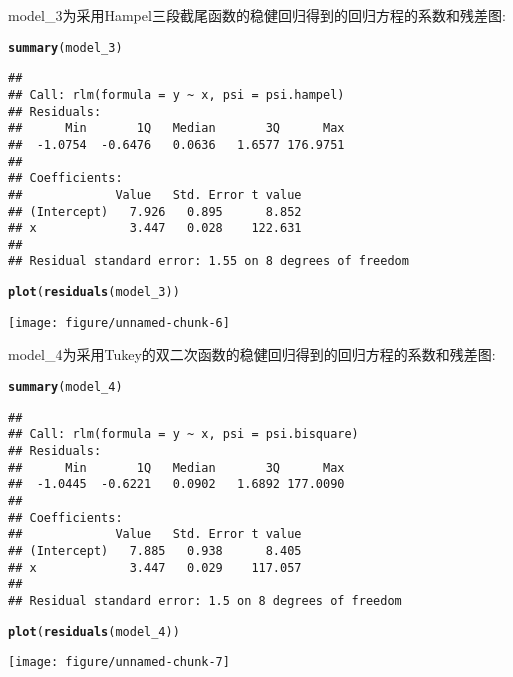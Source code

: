 \documentclass[english]{article}\usepackage[]{graphicx}\usepackage[]{color}
\makeatletter
\def\maxwidth{ %
  \ifdim\Gin@nat@width>\linewidth
    \linewidth
  \else
    \Gin@nat@width
  \fi
}
\newcommand{\hlkwd}[1]{\textcolor[rgb]{0.737,0.353,0.396}{\textbf{#1}}}%
\newenvironment{kframe}{%
 \def\at@end@of@kframe{}%
 \ifinner\ifhmode%
  \def\at@end@of@kframe{\end{minipage}}%
  \begin{minipage}{\columnwidth}%
 \fi\fi%
 \def\FrameCommand##1{\hskip\@totalleftmargin \hskip-\fboxsep
 \colorbox{shadecolor}{##1}\hskip-\fboxsep
     \hskip-\linewidth \hskip-\@totalleftmargin \hskip\columnwidth}%
 \MakeFramed {\advance\hsize-\width
   \@totalleftmargin\z@ \linewidth\hsize
   \@setminipage}}%
 {\par\unskip\endMakeFramed%
 \at@end@of@kframe}
\newenvironment{knitrout}{}{} %
\makeatother
\begin{document}
model\_3为采用Hampel三段截尾函数的稳健回归得到的回归方程的系数和残差图:

\begin{knitrout}
\color{fgcolor}\begin{kframe}
\begin{alltt}
\hlkwd{summary}(model_3)
\end{alltt}
\begin{verbatim}
## 
## Call: rlm(formula = y ~ x, psi = psi.hampel)
## Residuals:
##      Min       1Q   Median       3Q      Max 
##  -1.0754  -0.6476   0.0636   1.6577 176.9751 
## 
## Coefficients:
##             Value   Std. Error t value
## (Intercept)   7.926   0.895      8.852
## x             3.447   0.028    122.631
## 
## Residual standard error: 1.55 on 8 degrees of freedom
\end{verbatim}
\begin{alltt}
\hlkwd{plot}(\hlkwd{residuals}(model_3))
\end{alltt}
\end{kframe}
\texttt{[image: figure/unnamed-chunk-6]} 

\end{knitrout}


model\_4为采用Tukey的双二次函数的稳健回归得到的回归方程的系数和残差图:

\begin{knitrout}
\color{fgcolor}\begin{kframe}
\begin{alltt}
\hlkwd{summary}(model_4)
\end{alltt}
\begin{verbatim}
## 
## Call: rlm(formula = y ~ x, psi = psi.bisquare)
## Residuals:
##      Min       1Q   Median       3Q      Max 
##  -1.0445  -0.6221   0.0902   1.6892 177.0090 
## 
## Coefficients:
##             Value   Std. Error t value
## (Intercept)   7.885   0.938      8.405
## x             3.447   0.029    117.057
## 
## Residual standard error: 1.5 on 8 degrees of freedom
\end{verbatim}
\begin{alltt}
\hlkwd{plot}(\hlkwd{residuals}(model_4))
\end{alltt}
\end{kframe}
\texttt{[image: figure/unnamed-chunk-7]} 

\end{knitrout}
\end{document}
